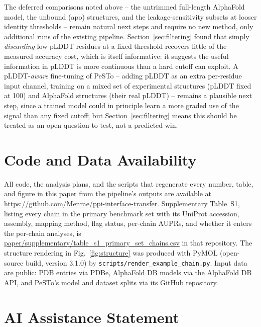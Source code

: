 \documentclass[10pt]{article}
\begin{document}
The deferred comparisons noted above -- the untrimmed full-length AlphaFold
model, the unbound (apo) structures, and the leakage-sensitivity subsets at
looser identity thresholds -- remain natural next steps and require no new
method, only additional runs of the existing pipeline.
Section~\ref{sec:filtering} found that simply \emph{discarding} low-pLDDT
residues at a fixed threshold recovers little of the measured accuracy cost,
which is itself informative: it suggests the useful information in pLDDT is
more continuous than a hard cutoff can exploit. A pLDDT-\emph{aware}
fine-tuning of PeSTo -- adding pLDDT as an extra per-residue input channel,
training on a mixed set of experimental structures (pLDDT fixed at 100) and
AlphaFold structures (their real pLDDT) -- remains a plausible next step,
since a trained model could in principle learn a more graded use of the
signal than any fixed cutoff; but Section~\ref{sec:filtering} means this
should be treated as an open question to test, not a predicted win.

\section*{Code and Data Availability}

All code, the analysis plans, and the scripts that regenerate every number,
table, and figure in this paper from the pipeline's outputs are available at
\url{https://github.com/Menrae/ppi-interface-transfer}. Supplementary Table~S1, listing every chain in the primary
benchmark set with its UniProt accession, assembly, mapping method, flag
status, per-chain AUPRs, and whether it enters the per-chain analyses, is
\url{paper/supplementary/table_s1_primary_set_chains.csv} in that repository. The structure rendering in
Fig.~\ref{fig:structure} was produced with PyMOL (open-source build, version
3.1.0) \cite{pymol} by \texttt{scripts/render\_example\_chain.py}.
Input data are public: PDB entries via PDBe, AlphaFold DB models via the
AlphaFold DB API, and PeSTo's model and dataset splits via its GitHub
repository.

\section*{AI Assistance Statement}
\end{document}
